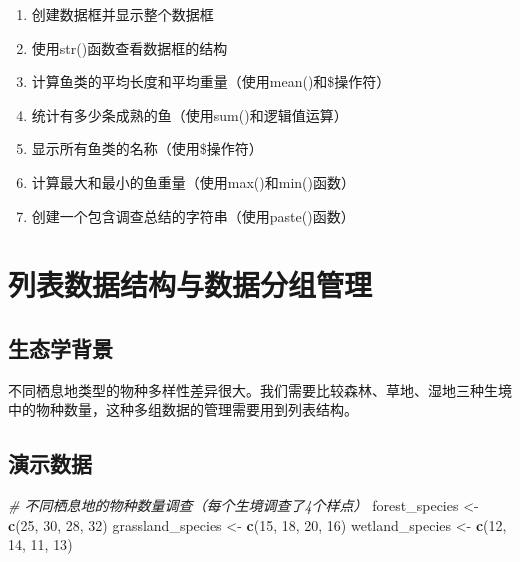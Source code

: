 \documentclass[
  twoside]{book}
\newenvironment{Shaded}{\begin{snugshade}}{\end{snugshade}}
\newcommand{\CommentTok}[1]{\textcolor[rgb]{0.56,0.35,0.01}{\textit{#1}}}
\newcommand{\DecValTok}[1]{\textcolor[rgb]{0.00,0.00,0.81}{#1}}
\newcommand{\FunctionTok}[1]{\textcolor[rgb]{0.13,0.29,0.53}{\textbf{#1}}}
\newcommand{\NormalTok}[1]{#1}
\newcommand{\OtherTok}[1]{\textcolor[rgb]{0.56,0.35,0.01}{#1}}
\begin{document}
\begin{enumerate}
\def\labelenumi{\arabic{enumi}.}
\item
  创建数据框并显示整个数据框
\item
  使用str()函数查看数据框的结构
\item
  计算鱼类的平均长度和平均重量（使用mean()和\$操作符）
\item
  统计有多少条成熟的鱼（使用sum()和逻辑值运算）
\item
  显示所有鱼类的名称（使用\$操作符）
\item
  计算最大和最小的鱼重量（使用max()和min()函数）
\item
  创建一个包含调查总结的字符串（使用paste()函数）
\end{enumerate}

\hypertarget{ux5217ux8868ux6570ux636eux7ed3ux6784ux4e0eux6570ux636eux5206ux7ec4ux7ba1ux7406}{%
\section{列表数据结构与数据分组管理}\label{ux5217ux8868ux6570ux636eux7ed3ux6784ux4e0eux6570ux636eux5206ux7ec4ux7ba1ux7406}}

\hypertarget{ux751fux6001ux5b66ux80ccux666f-3}{%
\subsection{生态学背景}\label{ux751fux6001ux5b66ux80ccux666f-3}}

不同栖息地类型的物种多样性差异很大。我们需要比较森林、草地、湿地三种生境中的物种数量，这种多组数据的管理需要用到列表结构。

\hypertarget{ux6f14ux793aux6570ux636e-3}{%
\subsection{演示数据}\label{ux6f14ux793aux6570ux636e-3}}

\begin{Shaded}
\begin{Highlighting}[]
\CommentTok{\# 不同栖息地的物种数量调查（每个生境调查了4个样点）}
\NormalTok{forest\_species }\OtherTok{\textless{}{-}} \FunctionTok{c}\NormalTok{(}\DecValTok{25}\NormalTok{, }\DecValTok{30}\NormalTok{, }\DecValTok{28}\NormalTok{, }\DecValTok{32}\NormalTok{)}
\NormalTok{grassland\_species }\OtherTok{\textless{}{-}} \FunctionTok{c}\NormalTok{(}\DecValTok{15}\NormalTok{, }\DecValTok{18}\NormalTok{, }\DecValTok{20}\NormalTok{, }\DecValTok{16}\NormalTok{)  }
\NormalTok{wetland\_species }\OtherTok{\textless{}{-}} \FunctionTok{c}\NormalTok{(}\DecValTok{12}\NormalTok{, }\DecValTok{14}\NormalTok{, }\DecValTok{11}\NormalTok{, }\DecValTok{13}\NormalTok{)}
\end{Highlighting}
\end{Shaded}
\end{document}
